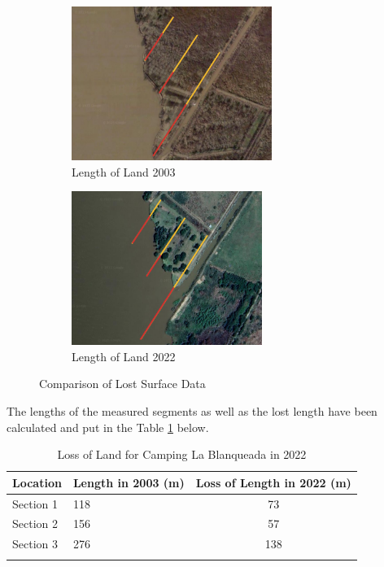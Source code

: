 \begin{figure}[H]
    \centering
    \begin{subfigure}[b]{0.45\textwidth} %
        \includegraphics[width=\linewidth, height=5cm]{figures/ch5/length2003.png}
        \caption{Length of Land 2003}
        \label{fig:length2003}
    \end{subfigure}
    \hfill
    \begin{subfigure}[b]{0.45\textwidth} %
        \includegraphics[width=\linewidth, height=5cm]{figures/ch5/length2022.png}
        \caption{Length of Land 2022}
        \label{fig:length2022}
    \end{subfigure}
    \caption{Comparison of Lost Surface Data}
    \label{fig:lengthlost_comparison}
\end{figure}

The lengths of the measured segments as well as the lost length have been calculated and put in the Table \ref{Table:Loss of Land for Camping La Blanqueada in 2022} below.


\begin{table}[H]
\centering
\caption{Loss of Land for Camping La Blanqueada in 2022}
\begin{tabular}{l l c}
\toprule
Location & Length in 2003 (m) & Loss of Length in 2022 (m) \\
\midrule
Section 1 & 118  & 73 \\
Section 2 & 156 & 57 \\
Section 3 & 276 & 138 \\
\bottomrule
\label{Table:Loss of Land for Camping La Blanqueada in 2022}
\end{tabular}
\end{table}

